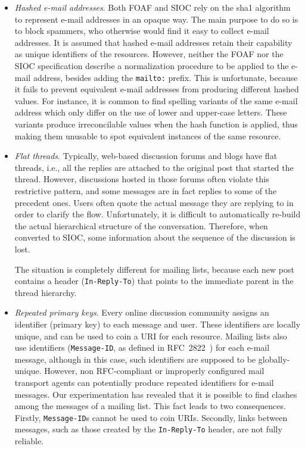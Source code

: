\documentclass{../templates/www2008-submission}
\begin{document}
\begin{itemize}
  \item \emph{Hashed e-mail addresses}. Both FOAF and SIOC
        rely on the sha1 algorithm~\cite{Eastlake2001} to represent
        e-mail addresses in an opaque way. The main purpose to do so
        is to block spammers, who otherwise would find it easy to collect
        e-mail addresses. It is
        assumed that hashed e-mail addresses retain their capability
        as unique identifiers of the resources. However, neither
        the FOAF nor the SIOC specification describe a normalization
        procedure to be applied to the e-mail address, besides adding
        the \texttt{mailto:} prefix. This is unfortunate, because it
        fails to prevent equivalent
        e-mail addresses from producing different hashed values. For instance,
        it is common to find spelling variants of the same
        e-mail address which only differ on the use of lower and upper-case
        letters. These variants produce irreconcilable values
        when the hash function is applied, thus making them unusable
        to spot equivalent instances of the same resource.

  \item \emph{Flat threads}. Typically, web-based discussion forums and blogs
        have flat threads, i.e., all the replies are attached to the original
        post that started the thread. However, discussions hosted in those
        forums often violate this restrictive pattern, and some messages
        are in fact replies to some of the precedent ones. Users often
        quote the actual message they are replying to in order to clarify the
        flow. Unfortunately, it is difficult to automatically re-build
        the actual hierarchical structure of the conversation. Therefore,
        when converted to SIOC, some information about the sequence of
        the discussion is lost.

        The situation is completely different for mailing lists, because
        each new post contains a header (\texttt{In-Reply-To}) that points
        to the immediate parent in the thread hierarchy.

  \item \emph{Repeated primary keys}. Every online discussion community assigns
        an identifier (primary key) to each message and user. These
        identifiers are locally unique, and can be used to coin a URI
        for each resource. Mailing lists also use identifiers
        (\texttt{Message-ID}, as defined in RFC~2822~\cite{RFC2822}) for
        each e-mail message, although in this case, such identifiers are
        supposed to be globally-unique. However, non RFC-compliant or
        improperly configured mail transport agents can potentially produce repeated
        identifiers for e-mail messages. Our experimentation has
        revealed that it is possible to find clashes among the messages
        of a mailing list. This fact leads to two consequences. Firstly,
        \texttt{Message-ID}s cannot be used to coin URIs. Secondly,
        links between messages, such as those created by the
        \texttt{In-Reply-To} header, are not fully reliable.


\end{itemize}
\end{document}
